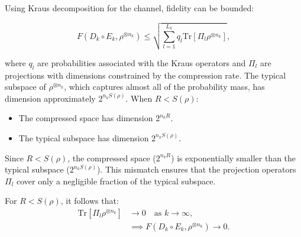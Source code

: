 \begin{flushleft}
Using Kraus decomposition for the channel, fidelity can be bounded:
\end{flushleft}
\[
F(D_k \circ E_k, \rho^{\otimes n_k}) \leq \sqrt{\sum_{l=1}^{L_k} q_l \text{Tr}[\Pi_l \rho^{\otimes n_k}]},
\]

\begin{flushleft}
where \(q_l\) are probabilities associated with the Kraus operators and \(\Pi_l\) are projections with dimensions constrained by the compression rate.
\newline
\newline
The typical subspace of \(\rho^{\otimes n_k}\), which captures almost all of the probability mass, has dimension approximately \(2^{n_k S(\rho)}\). When \(R < S(\rho)\):
\end{flushleft}

\begin{itemize}
    \item The compressed space has dimension \(2^{n_k R}\).
    \item The typical subspace has dimension \(2^{n_k S(\rho)}\).
\end{itemize}

\begin{flushleft}
Since \(R < S(\rho)\), the compressed space (\(2^{n_k R}\)) is exponentially smaller than the typical subspace (\(2^{n_k S(\rho)}\)). This mismatch ensures that the projection operators \(\Pi_l\) cover only a negligible fraction of the typical subspace.
\end{flushleft}

For \(R < S(\rho)\), it follows that:
\[
\begin{aligned}
    \text{Tr}[\Pi_l \rho^{\otimes n_k}] &\to 0 \quad \text{as } k \to \infty, \\
    &\implies F(D_k \circ E_k, \rho^{\otimes n_k}) \to 0.
\end{aligned}
\]
